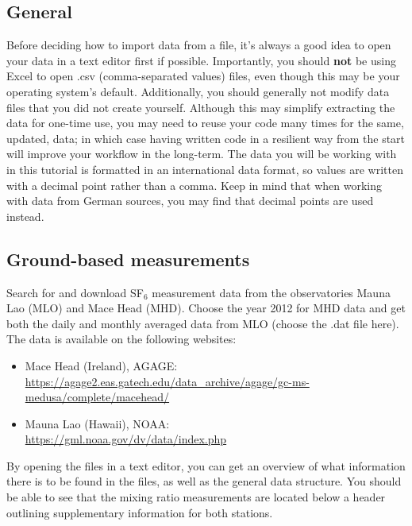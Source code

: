 \documentclass{article}
\theoremstyle{definition}
\begin{document}
\subsection{General}
Before deciding how to import data from a file, it's always a good idea to open your data in a text editor first if possible. Importantly, you should \textbf{not} be using Excel to open .csv (comma-separated values) files, even though this may be your operating system's default. Additionally, you should generally not modify data files that you did not create yourself. Although this may simplify extracting the data for one-time use, you may need to reuse your code many times for the same, updated, data; in which case having written code in a resilient way from the start will improve your workflow in the long-term. The data you will be working with in this tutorial is formatted in an international data format, so values are written with a decimal point rather than a comma. Keep in mind that when working with data from German sources, you may find that decimal points are used instead. 

\subsection{Ground-based measurements}
Search for and download SF$_6$ measurement data from the observatories Mauna Lao (MLO) and Mace Head (MHD). Choose the year 2012 for MHD data and get both the daily and monthly averaged data from MLO (choose the .dat file here). The data is available on the following websites: 

\begin{itemize}
    \item Mace Head (Ireland), AGAGE: \\
    \url{https://agage2.eas.gatech.edu/data_archive/agage/gc-ms-medusa/complete/macehead/} 
    \item Mauna Lao (Hawaii), NOAA: \\
    \url{https://gml.noaa.gov/dv/data/index.php} 
\end{itemize}

By opening the files in a text editor, you can get an overview of what information there is to be found in the files, as well as the general data structure. You should be able to see that the mixing ratio measurements are located below a header outlining supplementary information for both stations. 
\end{document}
